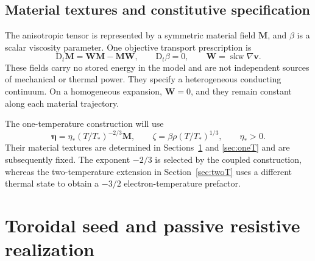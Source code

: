 \documentclass[11pt,a4paper]{article}
\theoremstyle{remark}\newtheorem{remark}{Remark}
\numberwithin{equation}{section}
\newcommand{\vv}{\boldsymbol v}
\newcommand{\MM}{\boldsymbol M}
\newcommand{\etab}{\boldsymbol\eta}
\newcommand{\grad}{\nabla}
\newcommand{\Dt}{\mathrm D_t}
\newcommand{\skw}{\operatorname{skw}}
\begin{document}
\subsection{Material textures and constitutive specification}
The anisotropic tensor is represented by a symmetric material field $\MM$, and $\beta$ is a scalar viscosity parameter. One objective transport prescription is
\begin{equation}
\Dt\MM=\boldsymbol W\MM-\MM\boldsymbol W,\qquad
\Dt\beta=0,\qquad \boldsymbol W=\skw\grad\vv.
\label{eq:textures}
\end{equation}
These fields carry no stored energy in the model and are not independent sources of mechanical or thermal power. They specify a heterogeneous conducting continuum. On a homogeneous expansion, $\boldsymbol W=0$, and they remain constant along each material trajectory.

The one-temperature construction will use
\begin{equation}
\etab=\eta_*(T/T_*)^{-2/3}\MM,\qquad
\zeta=\beta\rho(T/T_*)^{1/3},\qquad \eta_*>0.
\label{eq:oneclosures}
\end{equation}
Their material textures are determined in Sections~\ref{sec:realization} and \ref{sec:oneT} and are subsequently fixed. The exponent $-2/3$ is selected by the coupled construction, whereas the two-temperature extension in Section~\ref{sec:twoT} uses a different thermal state to obtain a $-3/2$ electron-temperature prefactor.


\section{Toroidal seed and passive resistive realization}\label{sec:realization}
\end{document}
